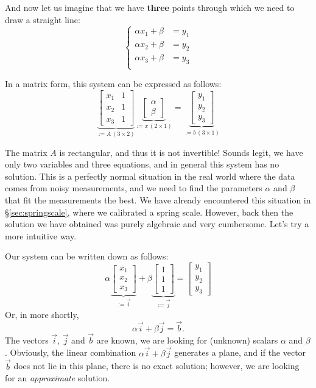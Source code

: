 \documentclass[notitlepage]{report}
\begin{document}
And now let us imagine that we have \textbf{three} points through which we need to draw a straight line:
$$
\left\{
\begin{split}
\alpha x_1 + \beta &= y_1\\
\alpha x_2 + \beta &= y_2\\
\alpha x_3 + \beta &= y_3\\
\end{split}
\right.
$$

In a matrix form, this system can be expressed as follows:
$$
\underbrace{\begin{bmatrix}x_1  & 1 \\ x_2 & 1 \\x_3 & 1 \end{bmatrix} }_{:= A\,(3\times 2)}
\underbrace{\begin{bmatrix} \alpha \\ \beta \end{bmatrix}}_{:=x\,(2\times 1)} = \underbrace{\begin{bmatrix} y_1 \\ y_2 \\ y_3 \end{bmatrix}}_{:=b\, (3\times 1)}
$$

The matrix $A$ is rectangular, and thus it is not invertible!
Sounds legit, we have only two variables and three equations, and in general this system has no solution.
This is a perfectly normal situation in the real world where the data comes from noisy measurements,
and we need to find the parameters $\alpha$ and $\beta$ that fit the measurements the best.
We have already encountered this situation in \S\ref{sec:springscale}, where we calibrated a spring scale.
However, back then the solution we have obtained was purely algebraic and very cumbersome. Let's try a more intuitive way.

Our system can be written down as follows:
$$
\alpha \underbrace{\begin{bmatrix}x_1  \\ x_2 \\x_3  \end{bmatrix} }_{:=\vec{i}}
+\beta \underbrace{\begin{bmatrix}1 \\ 1 \\1 \end{bmatrix} }_{:=\vec{j}} = 
\begin{bmatrix}y_1\\y_2\\y_3\end{bmatrix}
$$
Or, in more shortly,
$$
\alpha \vec{i} + \beta\vec{j} = \vec{b}.
$$
The vectors $\vec i$, $\vec j$ and $\vec b$ are known, we are looking for (unknown) scalars $\alpha$ and $\beta$.
Obviously, the linear combination $\alpha \vec{i} + \beta\vec{j}$ generates a plane, and if the vector $\vec b$
does not lie in this plane, there is no exact solution; however, we are looking for an \textit{approximate} solution.
\end{document}
